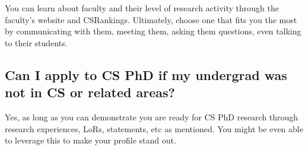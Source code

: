 \documentclass[11pt]{article}
\newenvironment{commentbox}[1][]{
\small
    \begin{cbox}
    \textbf{#1}: 
 }{
   \end{cbox}
}
\begin{document}
You can learn about faculty and their level of research activity through the faculty's website and CSRankings.
Ultimately, choose one that fits you the most by communicating with them, meeting them, asking them questions, even talking to their students. 







\subsection{Can I apply to CS PhD if my undergrad was not in CS or related areas?}

Yes, as long as you can demonstrate you are ready for CS PhD research through research experiences, LoRs, statements, etc as mentioned. You might be even able to leverage this to make your profile stand out.
\end{document}
